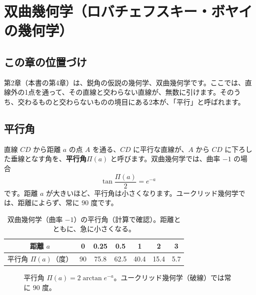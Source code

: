 \documentclass[a4paper,11pt,openany]{ltjsbook}
\begin{document}
\chapter{双曲幾何学（ロバチェフスキー・ボヤイの幾何学）}

\section{この章の位置づけ}

第2章（本書の第4章）は、鋭角の仮説の幾何学、双曲幾何学です。ここでは、直線外の1点を通って、その直線と交わらない直線が、無数に引けます。そのうち、交わるものと交わらないものの境目にある2本が、「平行」と呼ばれます。

\section{平行角}

直線 $CD$ から距離 $a$ の点 $A$ を通る、$CD$ に平行な直線が、$A$ から $CD$ に下ろした垂線となす角を、\textbf{平行角}$\Pi(a)$ と呼びます。双曲幾何学では、曲率 $-1$ の場合
\[
\tan\frac{\Pi(a)}2=e^{-a}
\]
です。距離 $a$ が大きいほど、平行角は小さくなります。ユークリッド幾何学では、距離によらず、常に $90$ 度です。

\begin{table}[htbp]
\centering
\begin{tabular}{c|cccccc}
\toprule
距離 $a$ & 0 & 0.25 & 0.5 & 1 & 2 & 3\\
\midrule
平行角 $\Pi(a)$（度） & 90 & 75.8 & 62.5 & 40.4 & 15.4 & 5.7\\
\bottomrule
\end{tabular}
\caption{双曲幾何学（曲率 $-1$）の平行角（計算で確認）。距離とともに、急に小さくなる。}
\end{table}

\begin{figure}[htbp]
\centering
{}
\caption{平行角 $\Pi(a)=2\arctan e^{-a}$。ユークリッド幾何学（破線）では常に $90$ 度。}
\end{figure}
\end{document}
